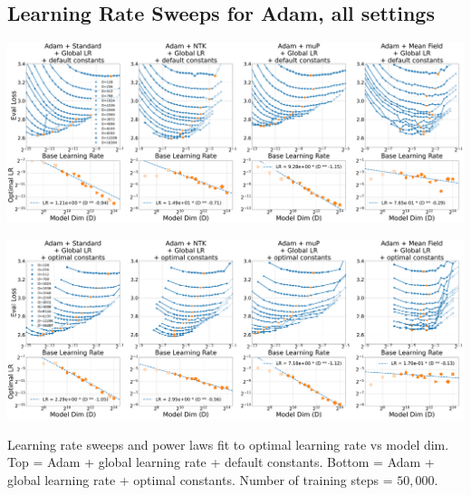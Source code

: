 \clearpage
\thispagestyle{plain}
\begin{SidewaysFigure}
\subsection{Learning Rate Sweeps for Adam, all settings}
\label{sec:app_lr_sweeps_adam}
\vspace{12pt}
\includegraphics[width=0.98\linewidth]{icml2024/figures/lr_sweeps/appendix/adam/adam+50k_steps.pdf}

\figvspace

\includegraphics[width=0.98\linewidth]{icml2024/figures/lr_sweeps/appendix/adam/adam+50k_steps_optimal_constants_only.pdf}
\caption{Learning rate sweeps and power laws fit to optimal learning rate vs model dim. Top = Adam + global learning rate + default constants. Bottom = Adam + global learning rate + optimal constants. Number of training steps = $50{,}000$.}
\end{SidewaysFigure}
\clearpage

